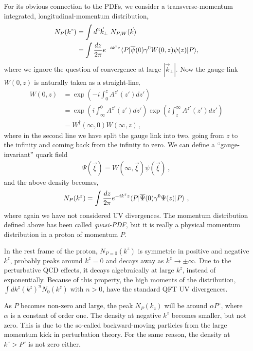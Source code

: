 \documentclass[aps,rmp,reprint,amsmath,amssymb,graphicx,longbibliography]{revtex4-1} %
\begin{document}
For its obvious connection to the PDFs, we consider a transverse-momentum
integrated, longitudinal-momentum distribution,
\begin{align}
	N_P(k^z)&=\int  d^2\vec{k}_\perp\ N_{P,W}(\vec{k}) \nonumber \\
	&=\int {dz\over{2\pi}} e^{-ik^z z} \langle P|\overline{\psi}(0)\gamma^0 W(0,z)\psi(z)|P\rangle,
	\label{eq:momdis1}
\end{align}
where we ignore the question of convergence at large $|\vec{k}_\perp| $.
Now the gauge-link $W(0,z)$ is naturally taken as a straight-line,
\begin{align}
	W(0,z) &= \exp(-i\int^z_0 A^{z'}(z') dz') \nonumber \\
	&= \exp(i\int^0_\infty A^{z'}(z') dz')\exp(i\int^\infty_z A^{z'}(z') dz')\nonumber \\
	&= W^\dagger(\infty,0) W(\infty,z)\,,
\end{align}
where in the second line we have split the gauge link into two, going from $z$ to the infinity
and coming back from the infinity to zero. We can define a ``gauge-invariant''
quark field
\begin{align}
	\Psi(\vec{\xi}) = W(\infty,\vec{\xi})\psi(\vec{\xi}) \ ,
\end{align}
and the above density becomes,
\begin{align}
	N_P(k^z)= \int {dz\over {2\pi}} e^{-ik^z z}  \langle P|\overline{\Psi}(0)\gamma^0\Psi(z)|P\rangle \ ,
	\label{eq:momdis}
\end{align}
where again we have not considered UV divergences. The momentum
distribution defined above has been called {\it quasi-PDF}, but it is really
a physical momentum distribution in a proton of momentum $P$.

In the rest frame of the proton, $N_{{P=0}}(k^z)$ is symmetric in positive and negative $ k^z$,
probably peaks around $k^z=0$ and decays away as $k^z\to \pm\infty$.
Due to the perturbative QCD effects, it decays algebraically at large $k^z$, instead of exponentially.
Because of this property, the high moments of the distribution, $\int dk^z (k^z)^n N_0(k^z)$ with $n>0$,
have the standard QFT UV divergences.

As $P$ becomes non-zero and large, the peak $N_P(k_z)$ will be around $\alpha P^z$,
where $\alpha$ is a constant of order one. The density
at negative $k^z$ becomes smaller, but not zero. This is due to the so-called
backward-moving particles from the
large momentum kick in perturbation theory. For the same reason, the density at $k^z>P^z$ is not zero
either.
\end{document}

